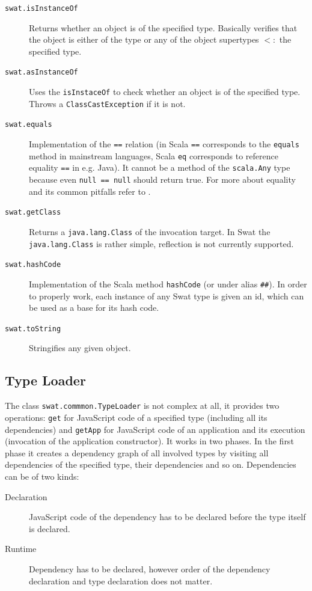 \documentclass[12pt,a4paper]{report}
\begin{document}
\begin{description}
\item[\texttt{swat.isInstanceOf}] Returns whether an object is of the specified type. Basically verifies that the object is either of the type or any of the object supertypes $<:$ the specified type.
\item[\texttt{swat.asInstanceOf}] Uses the \texttt{isInstaceOf} to check whether an object is of the specified type. Throws a \texttt{ClassCastException} if it is not.
\item[\texttt{swat.equals}] Implementation of the \texttt{==} relation (in Scala \texttt{==} corresponds to the \texttt{equals} method in mainstream languages, Scala \texttt{eq} corresponds to reference equality \texttt{==} in e.g. Java). It cannot be a method of the \texttt{scala.Any} type because even \texttt{null == null} should return true. For more about equality and its common pitfalls refer to \cite{Equality}.
\item[\texttt{swat.getClass}] Returns a \texttt{java.lang.Class} of the invocation target. In Swat the \texttt{java.lang.Class} is rather simple, reflection is not currently supported. 
\item[\texttt{swat.hashCode}] Implementation of the Scala method \texttt{hashCode} (or under alias \texttt{\#\#}). In order to properly work, each instance of any Swat type is given an id, which can be used as a base for its hash code.
\item[\texttt{swat.toString}] Stringifies any given object.
\end{description}

\subsection{Type Loader}

The class \texttt{swat.commmon.TypeLoader} is not complex at all, it provides two operations: \texttt{get} for JavaScript code of a specified type (including all its dependencies) and \texttt{getApp} for JavaScript code of an application and its execution (invocation of the application constructor). It works in two phases. In the first phase it creates a dependency graph of all involved types by visiting all dependencies of the specified type, their dependencies and so on. Dependencies can be of two kinds:

\begin{description}
\item[Declaration] JavaScript code of the dependency has to be declared before the type itself is declared.
\item[Runtime] Dependency has to be declared, however order of the dependency declaration and type declaration does not matter.
\end{description}
\end{document}
